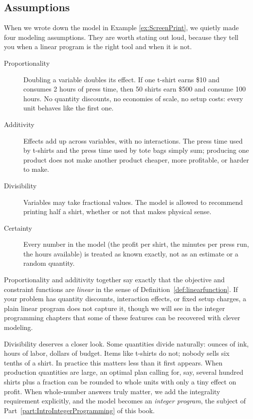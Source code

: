 \subsection{Assumptions}
\label{sec:lp-assumptions}
When we wrote down the model in Example \ref{ex:ScreenPrint}, we quietly made four modeling assumptions.  They are worth stating out loud, because they tell you when a linear program is the right tool and when it is not.

\begin{description}
\item[Proportionality] Doubling a variable doubles its effect.  If one t-shirt earns \$10 and consumes 2 hours of press time, then 50 shirts earn \$500 and consume 100 hours.  No quantity discounts, no economies of scale, no setup costs: every unit behaves like the first one.

\item[Additivity] Effects add up across variables, with no interactions.  The press time used by t-shirts and the press time used by tote bags simply sum; producing one product does not make another product cheaper, more profitable, or harder to make.

\item[Divisibility] Variables may take fractional values.  The model is allowed to recommend printing half a shirt, whether or not that makes physical sense.

\item[Certainty] Every number in the model (the profit per shirt, the minutes per press run, the hours available) is treated as known exactly, not as an estimate or a random quantity.
\end{description}

Proportionality and additivity together say exactly that the objective and constraint functions are \emph{linear} in the sense of Definition~\ref{def:linearfunction}.  If your problem has quantity discounts, interaction effects, or fixed setup charges, a plain linear program does not capture it, though we will see in the integer programming chapters that some of these features can be recovered with clever modeling.

Divisibility deserves a closer look.  Some quantities divide naturally: ounces of ink, hours of labor, dollars of budget.  Items like t-shirts do not; nobody sells six tenths of a shirt.  In practice this matters less than it first appears.  When production quantities are large, an optimal plan calling for, say, several hundred shirts plus a fraction can be rounded to whole units with only a tiny effect on profit.  When whole-number answers truly matter, we add the integrality requirement explicitly, and the model becomes an \emph{integer program}, the subject of Part~\ref{part:IntroIntegerProgramming} of this book.

